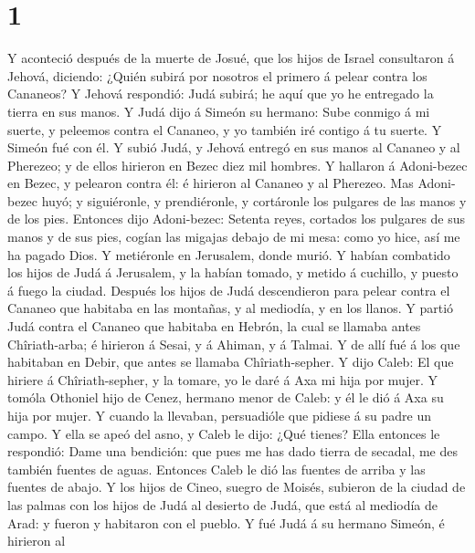 \hypertarget{section}{%
\section{1}\label{section}}

 Y aconteció después de la muerte de Josué, que los hijos de
Israel consultaron á Jehová, diciendo: ¿Quién subirá por nosotros el
primero á pelear contra los Cananeos?  Y Jehová respondió:
Judá subirá; he aquí que yo he entregado la tierra en sus manos.
 Y Judá dijo á Simeón su hermano: Sube conmigo á mi suerte,
y peleemos contra el Cananeo, y yo también iré contigo á tu suerte. Y
Simeón fué con él.  Y subió Judá, y Jehová entregó en sus
manos al Cananeo y al Pherezeo; y de ellos hirieron en Bezec diez mil
hombres.  Y hallaron á Adoni-bezec en Bezec, y pelearon
contra él: é hirieron al Cananeo y al Pherezeo.  Mas
Adoni-bezec huyó; y siguiéronle, y prendiéronle, y cortáronle los
pulgares de las manos y de los pies.  Entonces dijo
Adoni-bezec: Setenta reyes, cortados los pulgares de sus manos y de sus
pies, cogían las migajas debajo de mi mesa: como yo hice, así me ha
pagado Dios. Y metiéronle en Jerusalem, donde murió.  Y
habían combatido los hijos de Judá á Jerusalem, y la habían tomado, y
metido á cuchillo, y puesto á fuego la ciudad.  Después los
hijos de Judá descendieron para pelear contra el Cananeo que habitaba en
las montañas, y al mediodía, y en los llanos.  Y partió
Judá contra el Cananeo que habitaba en Hebrón, la cual se llamaba antes
Chîriath-arba; é hirieron á Sesai, y á Ahiman, y á Talmai. 
Y de allí fué á los que habitaban en Debir, que antes se llamaba
Chîriath-sepher.  Y dijo Caleb: El que hiriere á
Chîriath-sepher, y la tomare, yo le daré á Axa mi hija por mujer.
 Y tomóla Othoniel hijo de Cenez, hermano menor de Caleb: y
él le dió á Axa su hija por mujer.  Y cuando la llevaban,
persuadióle que pidiese á su padre un campo. Y ella se apeó del asno, y
Caleb le dijo: ¿Qué tienes?  Ella entonces le respondió:
Dame una bendición: que pues me has dado tierra de secadal, me des
también fuentes de aguas. Entonces Caleb le dió las fuentes de arriba y
las fuentes de abajo.  Y los hijos de Cineo, suegro de
Moisés, subieron de la ciudad de las palmas con los hijos de Judá al
desierto de Judá, que está al mediodía de Arad: y fueron y habitaron con
el pueblo.  Y fué Judá á su hermano Simeón, é hirieron al
